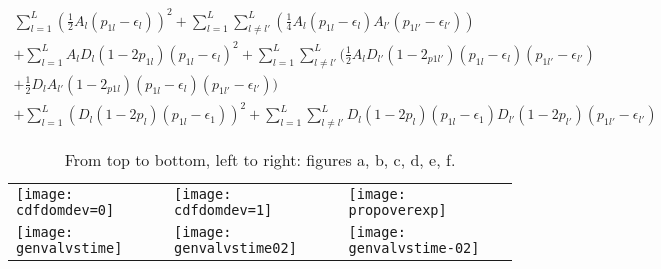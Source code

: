 \documentclass[a4paper,11pt]{article}
\begin{document}
\begin{equation}
  \begin{split}
  \sum^L_{l=1}( \frac{1}{2}A_l(p_{1l}-\epsilon_l))^2+\sum^L_{l=1}\sum^L_{
    l \neq l'}(\frac{1}{4}A_l(p_{1l}-\epsilon_{l})A_{l'}(p_{1l'}-\epsilon_{l'}))
  \\
  +\sum^L_{l=1}A_lD_l(1-2p_{1l})(p_{1l}-\epsilon_l)^2 +
  \sum^L_{l=1}\sum^L_{l \neq
    l'}(\frac{1}{2}A_lD_{l'}(1-2_{p1l'})(p_{1l}-\epsilon_l)(p_{1l'}-\epsilon_{l'}) \\
  + \frac{1}{2}D_lA_{l'}(1-2_{p1l})(p_{1l}-\epsilon_l)(p_{1l'}-\epsilon_{l'})) \\
   + \sum^L_{l=1} (D_l(1-2p_l)(p_{1l}-\epsilon_{1}))^2
   + \sum^L_{l=1}\sum^L_{l \neq
     l'}D_{l}(1-2p_{l})(p_{1l}-\epsilon_{1})D_{l'}(1-2p_{l'})(p_{1l'}-\epsilon_{l'}) \label{second_exp_ult}
  \end{split}
\end{equation}

\vspace{2cm}

\begin{table}[ht]
\caption{From top to bottom, left to right: figures a, b, c, d, e, f.}
\centering
\begin{tabular}{ p{5cm}p{5cm}p{5cm} }
\texttt{[image: cdfdomdev=0]}
  &\texttt{[image: cdfdomdev=1]}
  &\texttt{[image: propoverexp]}\\
\newline
\texttt{[image: genvalvstime]}
  &\texttt{[image: genvalvstime02]}
  &\texttt{[image: genvalvstime-02]}\\
\end{tabular}
\end{table}
\end{document}
